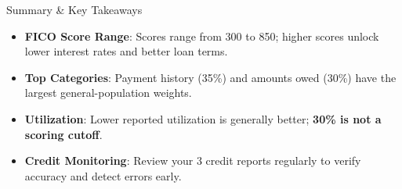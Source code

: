 \begin{block}{Summary \& Key Takeaways}
  \begin{itemize}
    \item \textbf{FICO Score Range}: Scores range from 300 to 850; higher scores unlock lower interest rates and better loan terms.
    \item \textbf{Top Categories}: Payment history (35\%) and amounts owed (30\%) have the largest general-population weights.
    \item \textbf{Utilization}: Lower reported utilization is generally better; \textbf{30\% is not a scoring cutoff}.
    \item \textbf{Credit Monitoring}: Review your 3 credit reports regularly to verify accuracy and detect errors early.
  \end{itemize}
\end{block}
